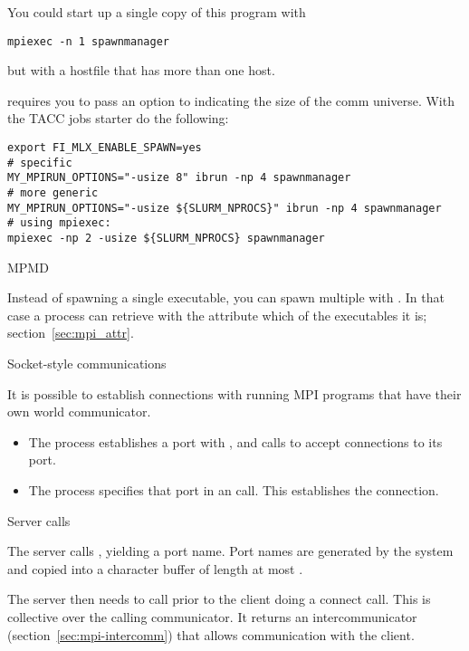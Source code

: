 You could start up a single copy of this program with 
\begin{verbatim}
mpiexec -n 1 spawnmanager
\end{verbatim}
but with a hostfile that has more than one host.

\begin{taccnote}
 requires you to pass an option  to
 indicating the size of the comm universe. With the TACC
jobs starter  do the following:
\begin{verbatim}
export FI_MLX_ENABLE_SPAWN=yes
# specific
MY_MPIRUN_OPTIONS="-usize 8" ibrun -np 4 spawnmanager
# more generic
MY_MPIRUN_OPTIONS="-usize ${SLURM_NPROCS}" ibrun -np 4 spawnmanager
# using mpiexec:
mpiexec -np 2 -usize ${SLURM_NPROCS} spawnmanager
\end{verbatim}
\end{taccnote}

 {MPMD}

Instead of spawning a single executable, you can spawn multiple with
.
In that case a process can retrieve with
the attribute
which of the executables it is;
section~\ref{sec:mpi_attr}.

 {Socket-style communications}

It is possible to establish connections with running MPI programs that
have their own world communicator.
\begin{itemize}
\item The  process establishes a port with 
  , and calls  to accept
  connections to its port.
\item The  process specifies that port 
  in an  call. This establishes the connection.
\end{itemize}

 {Server calls}

The server calls , yielding a port name.
Port names are generated by the system and copied into a character
buffer of length at most .

The server then needs to call 
 prior to the client doing a connect call.
This is collective over the calling communicator.
It returns an intercommunicator (section~\ref{sec:mpi-intercomm})
that allows communication with the client.


